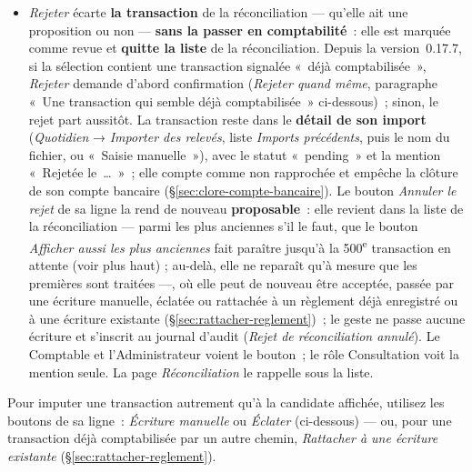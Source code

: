 \documentclass[a4paper,11pt,oneside]{article}
\begin{document}
\begin{itemize}
    \item \emph{Rejeter} écarte \textbf{la transaction} de la réconciliation --- qu'elle ait une proposition ou non --- \textbf{sans la passer en comptabilité}~: elle est marquée comme revue et \textbf{quitte la liste} de la réconciliation. Depuis la version~0.17.7, si la sélection contient une transaction signalée «~déjà comptabilisée~», \emph{Rejeter} demande d'abord confirmation (\emph{Rejeter quand même}, paragraphe «~Une transaction qui semble déjà comptabilisée~» ci-dessous)~; sinon, le rejet part aussitôt. La transaction reste dans le \textbf{détail de son import} (\emph{Quotidien} → \emph{Importer des relevés}, liste \emph{Imports précédents}, puis le nom du fichier, ou «~Saisie manuelle~»), avec le statut «~pending~» et la mention «~Rejetée le~\dots~»~; elle compte comme non rapprochée et empêche la clôture de son compte bancaire (\S\ref{sec:clore-compte-bancaire}). Le bouton \emph{Annuler le rejet} de sa ligne la rend de nouveau \textbf{proposable}~: elle revient dans la liste de la réconciliation --- parmi les plus anciennes s'il le faut, que le bouton \emph{Afficher aussi les plus anciennes} fait paraître jusqu'à la 500\textsuperscript{e} transaction en attente (voir plus haut) ; au-delà, elle ne reparaît qu'à mesure que les premières sont traitées ---, où elle peut de nouveau être acceptée, passée par une écriture manuelle, éclatée ou rattachée à un règlement déjà enregistré ou à une écriture existante (\S\ref{sec:rattacher-reglement})~; le geste ne passe aucune écriture et s'inscrit au journal d'audit (\emph{Rejet de réconciliation annulé}). Le Comptable et l'Administrateur voient le bouton~; le rôle Consultation voit la mention seule. La page \emph{Réconciliation} le rappelle sous la liste.
\end{itemize}

Pour imputer une transaction autrement qu'à la candidate affichée, utilisez les boutons de sa ligne~: \emph{Écriture manuelle} ou \emph{Éclater} (ci-dessous) --- ou, pour une transaction déjà comptabilisée par un autre chemin, \emph{Rattacher à une écriture existante} (\S\ref{sec:rattacher-reglement}).
\end{document}
